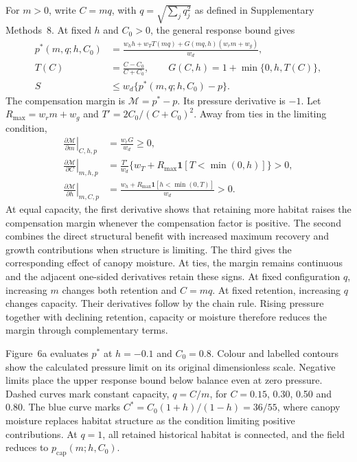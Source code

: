 For $m>0$, write $C=mq$, with $q=\sqrt{\sum_jq_j^2}$ as defined in Supplementary Methods~8. At fixed $h$ and $C_0>0$, the general response bound gives
\[
\begin{aligned}
p^*(m,q;h,C_0)&=\frac{w_hh+w_TT(mq)+G(mq,h)(w_rm+w_g)}{w_d},\\
T(C)&=\frac{C-C_0}{C+C_0},\qquad G(C,h)=1+\min\{0,h,T(C)\},\\
S&\leq w_d\{p^*(m,q;h,C_0)-p\}.
\end{aligned}
\]
The compensation margin is $\mathcal M=p^*-p$. Its pressure derivative is $-1$. Let $R_{\max}=w_rm+w_g$ and $T'=2C_0/(C+C_0)^2$. Away from ties in the limiting condition,
\[
\begin{aligned}
\left.\frac{\partial\mathcal M}{\partial m}\right|_{C,h,p}
 &=\frac{w_rG}{w_d}\geq0,\\
\left.\frac{\partial\mathcal M}{\partial C}\right|_{m,h,p}
 &=\frac{T'}{w_d}\{w_T+R_{\max}\mathbf1[T<\min(0,h)]\}>0,\\
\left.\frac{\partial\mathcal M}{\partial h}\right|_{m,C,p}
 &=\frac{w_h+R_{\max}\mathbf1[h<\min(0,T)]}{w_d}>0.
\end{aligned}
\]
At equal capacity, the first derivative shows that retaining more habitat raises the compensation margin whenever the compensation factor is positive. The second combines the direct structural benefit with increased maximum recovery and growth contributions when structure is limiting. The third gives the corresponding effect of canopy moisture. At ties, the margin remains continuous and the adjacent one-sided derivatives retain these signs. At fixed configuration $q$, increasing $m$ changes both retention and $C=mq$. At fixed retention, increasing $q$ changes capacity. Their derivatives follow by the chain rule. Rising pressure together with declining retention, capacity or moisture therefore reduces the margin through complementary terms.

Figure~6a evaluates $p^*$ at $h=-0.1$ and $C_0=0.8$. Colour and labelled contours show the calculated pressure limit on its original dimensionless scale. Negative limits place the upper response bound below balance even at zero pressure. Dashed curves mark constant capacity, $q=C/m$, for $C=0.15$, 0.30, 0.50 and 0.80. The blue curve marks $C^*=C_0(1+h)/(1-h)=36/55$, where canopy moisture replaces habitat structure as the condition limiting positive contributions. At $q=1$, all retained historical habitat is connected, and the field reduces to $p_{\mathrm{cap}}(m;h,C_0)$.

